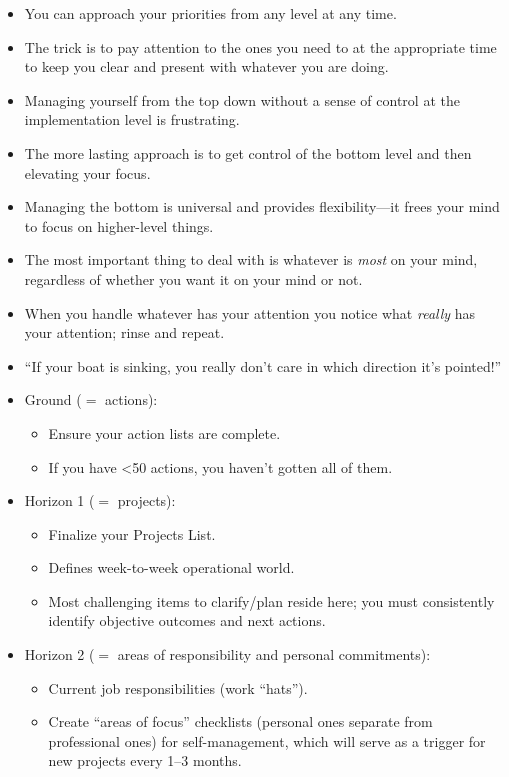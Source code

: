 \documentclass{article}
\begin{document}
\begin{itemize}
 \item You can approach your priorities from any level at any time.
 \item The trick is to pay attention to the ones you need to at the appropriate time to keep you clear and present with whatever you are doing.
 \item Managing yourself from the top down without a sense of control at the implementation level is frustrating.
 \item The more lasting approach is to get control of the bottom level and then elevating your focus.
 \item Managing the bottom is universal and provides flexibility---it frees your mind to focus on higher-level things.
 \item The most important thing to deal with is whatever is \emph{most} on your mind, regardless of whether you want it on your mind or not.
 \item When you handle whatever has your attention you notice what \emph{really} has your attention; rinse and repeat.
 \item ``If your boat is sinking, you really don't care in which direction it's pointed!''
 \item Ground ($=$ actions):
 \begin{itemize}
  \item Ensure your action lists are complete.
  \item If you have \textless 50 actions, you haven't gotten all of them.
 \end{itemize}
 \item Horizon 1 ($=$ projects):
 \begin{itemize}
  \item Finalize your Projects List.
  \item Defines week-to-week operational world.
  \item Most challenging items to clarify/plan reside here; you must consistently identify objective outcomes and next actions.
 \end{itemize}
 \item Horizon 2 ($=$ areas of responsibility and personal commitments):
 \begin{itemize}
  \item Current job responsibilities (work ``hats'').
  \item Create ``areas of focus'' checklists (personal ones separate from professional ones) for self-management, which will serve as a trigger for new projects every 1--3 months.

\end{itemize}
\end{itemize}
\end{document}
